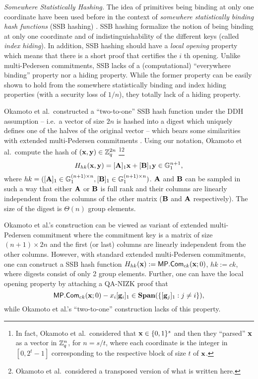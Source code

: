 \label{sec:mp-vs-others}
\emph{Somewhere Statistically Hashing.} The idea of primitives being binding at only one coordinate  have been used before
in the context of \emph{somewhere statistically binding hash functions} (SSB hashing) \cite{ITCS:HubWic15,AC:OPWW15}. SSB hashing formalize the notion of being binding at only one coordinate and of indistinguishability of the different keys (called \emph{index hiding}). In addition, SSB hashing should have a \emph{local opening} property which means that there is a short proof that certifies the $i$ th opening. Unlike multi-Pedersen commitments, SSB lacks of a (computational) ``everywhere binding'' property nor a hiding property. While the former property can be easily shown to hold from the somewhere statistically binding and index hiding properties (with a security loss of $1/n$), they totally lack of a hiding property.

Okamoto et al.~constructed a ``two-to-one'' SSB hash function under the DDH assumption -- i.e.~a vector of size $2n$ is hashed into a digest which uniquely defines one of the halves of the original vector -- which bears some similarities with extended multi-Pedersen commitments \cite{AC:OPWW15}. Using our notation, Okamoto et al.~compute the hash of $(\mathbf{x},\mathbf{y})\in\mathbb{Z}_q^{2n}$ \footnote{In fact, Okamoto et al.~considered that $\mathbf{x}\in\{0,1\}^s$ and then they ``parsed'' $\mathbf{x}$ as a vector in $\mathbb{Z}_q^n$, for $n=s/t$, where each coordinate is the integer in $[0,2^t-1]$ corresponding to the respective block of size $t$ of $\mathbf{x}$.}\footnote{Okamoto et al.~considered a transposed version of what is written here.}
$$
H_{hk}(\mathbf{x},\mathbf{y}) = [\mathbf{{A}}]_1\mathbf{x}+[\mathbf{{B}}]_1\mathbf{y}\in\mathbb{G}_1^{n+1},
$$
where $hk=([\mathbf{{A}}]_1\in\mathbb{G}_1^{(n+1)\times n},[\mathbf{{B}}]_1\in\mathbb{G}_1^{(n+1)\times n})$. $\mathbf{{A}}$ and $\mathbf{{B}}$ can be sampled in such a way that either $\mathbf{{A}}$ or $\mathbf{{B}}$  is full rank and their columns are linearly independent from the columns of the other matrix ($\mathbf{{B}}$ and $\mathbf{{A}}$ respectively). The size of the digest is $\Theta(n)$ group elements.

Okamoto et al.'s construction can be viewed as variant of extended multi-Pedersen commitment where the commitment key is a matrix of size $(n+1)\times2n$ and the first (or last) columns are linearly independent from the other columns. However, with standard extended multi-Pedersen commitments, one can construct a SSB hash function $H_{hk}(\mathbf{x}):=\mathsf{MP}.\mathsf{Com}_{ck}(\mathbf{x};0)$, $hk:=ck$, where digests consist of only 2 group elements. Further, one can have the local opening property by attaching a QA-NIZK proof that
$$\mathsf{MP}.\mathsf{Com}_{ck}(\mathbf{x};0)-x_i[\mathbf{g}_i]_1\in \mathbf{Span}(\{[\mathbf{g}_{j}]_1:j\neq i\}),$$
while Okamoto et al.'s ``two-to-one'' construction lacks of this property.

